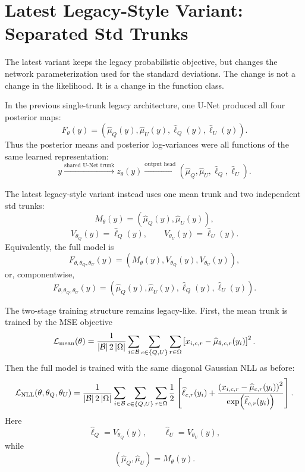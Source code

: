 \documentclass[11pt]{article}
\newcommand{\mean}{\mu}
\newcommand{\logvar}{\ell}
\newcommand{\pix}{r}
\newcommand{\chan}{c}
\newcommand{\grid}{\Omega}
\newcommand{\batch}{\mathcal{B}}
\begin{document}
\section{Latest Legacy-Style Variant: Separated Std Trunks}

The latest variant keeps the legacy probabilistic objective, but changes the
network parameterization used for the standard deviations.  The change is not a
change in the likelihood.  It is a change in the function class.

In the previous single-trunk legacy architecture, one U-Net produced all four
posterior maps:
\[
  F_\theta(y)
  =
  \left(
    \widehat{\mean}_{Q}(y),
    \widehat{\mean}_{U}(y),
    \widehat{\logvar}_{Q}(y),
    \widehat{\logvar}_{U}(y)
  \right).
\]
Thus the posterior means and posterior log-variances were all functions of the
same learned representation:
\[
  y
  \xrightarrow{\text{shared U-Net trunk}}
  z_\theta(y)
  \xrightarrow{\text{output head}}
  \left(
    \widehat{\mean}_{Q},
    \widehat{\mean}_{U},
    \widehat{\logvar}_{Q},
    \widehat{\logvar}_{U}
  \right).
\]

The latest legacy-style variant instead uses one mean trunk and two independent
std trunks:
\[
  M_\theta(y)
  =
  \left(
    \widehat{\mean}_{Q}(y),
    \widehat{\mean}_{U}(y)
  \right),
\]
\[
  V_{\theta_Q}(y)
  =
  \widehat{\logvar}_{Q}(y),
  \qquad
  V_{\theta_U}(y)
  =
  \widehat{\logvar}_{U}(y).
\]
Equivalently, the full model is
\[
  F_{\theta,\theta_Q,\theta_U}(y)
  =
  \left(
    M_\theta(y),
    V_{\theta_Q}(y),
    V_{\theta_U}(y)
  \right),
\]
or, componentwise,
\[
  F_{\theta,\theta_Q,\theta_U}(y)
  =
  \left(
    \widehat{\mean}_{Q}(y),
    \widehat{\mean}_{U}(y),
    \widehat{\logvar}_{Q}(y),
    \widehat{\logvar}_{U}(y)
  \right).
\]

The two-stage training structure remains legacy-like.  First, the mean trunk is
trained by the MSE objective
\[
  \mathcal{L}_{\rm mean}(\theta)
  =
  \frac{1}{|\batch|\,2\,|\grid|}
  \sum_{i\in\batch}
  \sum_{\chan\in\{Q,U\}}
  \sum_{\pix\in\grid}
  \left[
    x_{i,\chan,\pix}
    -
    \widehat{\mean}_{\theta,\chan,\pix}(y_i)
  \right]^2.
\]
Then the full model is trained with the same diagonal Gaussian NLL as before:
\[
  \mathcal{L}_{\rm NLL}(\theta,\theta_Q,\theta_U)
  =
  \frac{1}{|\batch|\,2\,|\grid|}
  \sum_{i\in\batch}
  \sum_{\chan\in\{Q,U\}}
  \sum_{\pix\in\grid}
  \frac{1}{2}
  \left[
    \widehat{\logvar}_{\chan,\pix}(y_i)
    +
    \frac{
      \left(
        x_{i,\chan,\pix}
        -
        \widehat{\mean}_{\chan,\pix}(y_i)
      \right)^2
    }{
      \exp\!\left(\widehat{\logvar}_{\chan,\pix}(y_i)\right)
    }
  \right].
\]
Here
\[
  \widehat{\logvar}_{Q}=V_{\theta_Q}(y),
  \qquad
  \widehat{\logvar}_{U}=V_{\theta_U}(y),
\]
while
\[
  (\widehat{\mean}_Q,\widehat{\mean}_U)=M_\theta(y).
\]
\end{document}
